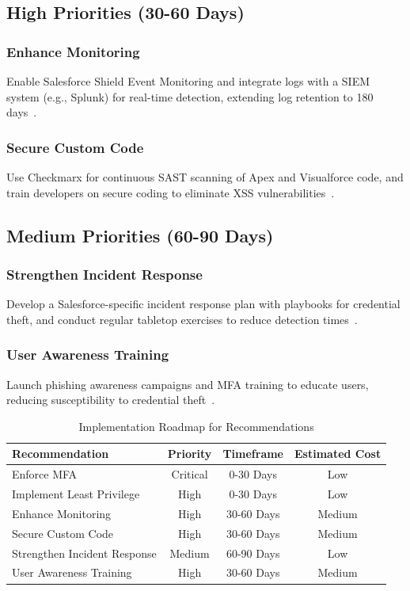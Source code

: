 \documentclass[12pt,a4paper]{article}
\begin{document}
\subsection{High Priorities (30-60 Days)}
\subsubsection{Enhance Monitoring}
Enable Salesforce Shield Event Monitoring and integrate logs with a SIEM system (e.g., Splunk) for real-time detection, extending log retention to 180 days~\cite{capstorm2023}.

\subsubsection{Secure Custom Code}
Use Checkmarx for continuous SAST scanning of Apex and Visualforce code, and train developers on secure coding to eliminate XSS vulnerabilities~\cite{checkmarx2025}.

\subsection{Medium Priorities (60-90 Days)}
\subsubsection{Strengthen Incident Response}
Develop a Salesforce-specific incident response plan with playbooks for credential theft, and conduct regular tabletop exercises to reduce detection times~\cite{onilab2024}.

\subsubsection{User Awareness Training}
Launch phishing awareness campaigns and MFA training to educate users, reducing susceptibility to credential theft~\cite{foundhq2025}.

\begin{table}[H]
\caption{Implementation Roadmap for Recommendations}
\label{tab:roadmap}
\centering
\begin{tabularx}{\textwidth}{|X|c|c|c|}
\hline
\rowcolor{primary!20}
\textbf{Recommendation} & \textbf{Priority} & \textbf{Timeframe} & \textbf{Estimated Cost} \\
\hline
\rowcolor{highlight!20}
Enforce MFA & Critical & 0-30 Days & Low \\
\rowcolor{highlight!10}
Implement Least Privilege & High & 0-30 Days & Low \\
Enhance Monitoring & High & 30-60 Days & Medium \\
\rowcolor{highlight!10}
Secure Custom Code & High & 30-60 Days & Medium \\
Strengthen Incident Response & Medium & 60-90 Days & Low \\
User Awareness Training & High & 30-60 Days & Medium \\
\hline
\end{tabularx}
\end{table}
\end{document}
